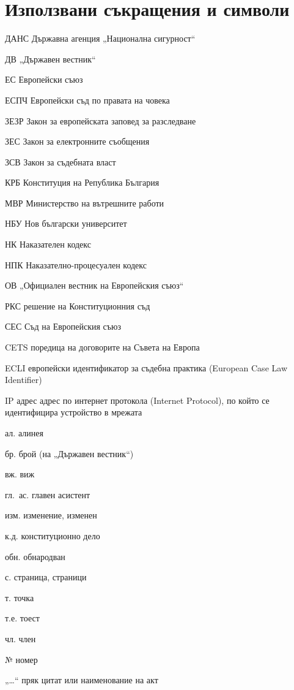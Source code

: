 \section*{Използвани съкращения и символи}
\label{sec:sakrashteniya}

{\small{}
\begin{multicols}{2}
\raggedright{}
\begin{abbrlist}
\item[ДАНС] Държавна агенция „Национална сигурност“
\item[ДВ] „Държавен вестник“
\item[ЕС] Европейски съюз
\item[ЕСПЧ] Европейски съд по правата на човека
\item[ЗЕЗР] Закон за европейската заповед за разследване
\item[ЗЕС] Закон за електронните съобщения
\item[ЗСВ] Закон за съдебната власт
\item[КРБ] Конституция на Република България
\item[МВР] Министерство на вътрешните работи
\item[НБУ] Нов български университет
\item[НК] Наказателен кодекс
\item[НПК] Наказателно-процесуален кодекс
\item[ОВ] „Официален вестник на Европейския съюз“
\item[РКС] решение на Конституционния съд
\item[СЕС] Съд на Европейския съюз
\item[CETS] поредица на договорите на Съвета на Европа
\item[ECLI] европейски идентификатор за съдебна практика (European Case Law Identifier)
\item[IP адрес] адрес по интернет протокола (Internet Protocol), по който се идентифицира устройство в мрежата
\item[ал.] алинея
\item[бр.] брой (на „Държавен вестник“)
\item[вж.] виж
\item[гл.~ас.] главен асистент
\item[изм.] изменение, изменен
\item[к.д.] конституционно дело
\item[обн.] обнародван
\item[с.] страница, страници
\item[т.] точка
\item[т.е.] тоест
\item[чл.] член
\item[№] номер
\item[„…“] пряк цитат или наименование на акт
\end{abbrlist}
\end{multicols}
}
